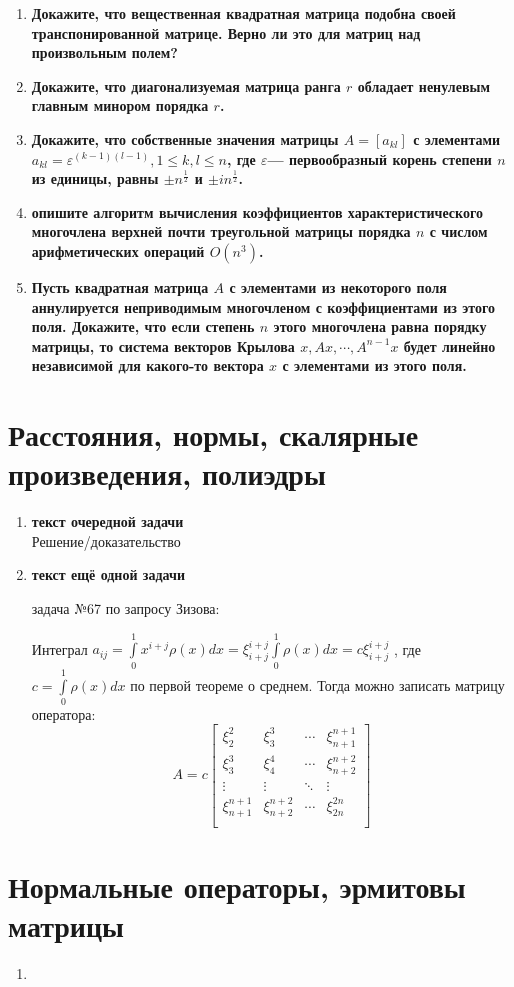\documentclass[12pt]{article} %
\begin{document}
\begin{enumerate}
    \item \textbf{Докажите, что вещественная квадратная матрица подобна своей транспонированной матрице. Верно ли это для матриц над произвольным полем?}
    \item \textbf{Докажите, что диагонализуемая матрица ранга $r$ обладает ненулевым главным минором порядка $r$.}
    \item \textbf{Докажите, что собственные значения матрицы $A = [a_{kl}]$ с элементами $a_{kl} = \varepsilon^{(k - 1)(l - 1)}, 1 \leqslant k, l \leqslant n$, где $\varepsilon$--- первообразный корень степени $n$ из единицы, равны $\pm n^{\frac{1}{2}}$ и $\pm in^{\frac{1}{2}}$.}
    \item \textbf{опишите алгоритм вычисления коэффициентов характеристического многочлена верхней почти треугольной матрицы порядка $n$ с числом арифметических операций $O(n^3)$.}
    \item \textbf{Пусть квадратная матрица $A$ с элементами из некоторого поля аннулируется неприводимым многочленом с коэффициентами из этого поля. Докажите, что если степень $n$ этого многочлена равна порядку матрицы, то система векторов Крылова $x, Ax, \cdots, A^{n-1}x$ будет линейно независимой для какого-то вектора $x$ с элементами из этого поля.}
\end{enumerate}
\section{Расстояния, нормы, скалярные произведения, полиэдры}
\begin{enumerate}%
    \item \textbf{текст очередной задачи}\\

    Решение/доказательство
    \item \textbf{текст ещё одной задачи}%



задача №67 по запросу Зизова:

Интеграл $a_{ij} = \int \limits_{0}^{1} x^{i + j} \rho(x)dx = \xi_{i + j}^{i + j} \int \limits_{0}^{1} \rho(x)dx = c \xi_{i + j}^{i + j}$ , где $c = \int \limits_{0}^{1} \rho(x)dx$ по первой теореме о среднем. Тогда можно записать матрицу оператора:
\[
A = c
\begin{bmatrix}
    \xi_2^2 & \xi_3^3 & \cdots & \xi_{n + 1}^{n + 1}\\
    \xi_3^3 & \xi_4^4 & \cdots & \xi_{n + 2}^{n + 2}\\
    \vdots & \vdots & \ddots & \vdots \\
    \xi_{n + 1}^{n + 1} & \xi_{n + 2}^{n + 2} & \cdots & \xi_{2n}^{2n}\\
\end{bmatrix}
\]

\end{enumerate}
\section{Нормальные операторы, эрмитовы матрицы}
\begin{enumerate}
    \item 
\end{enumerate}

\end{document}

